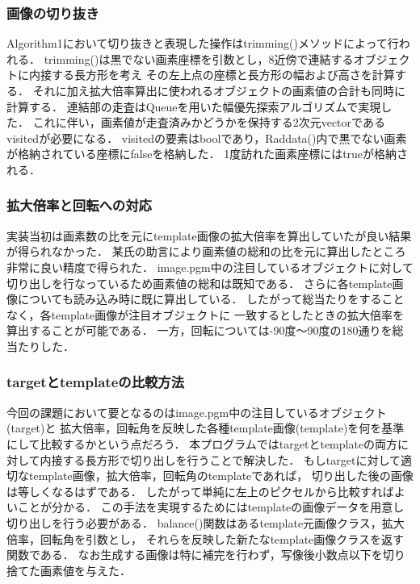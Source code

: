 \documentclass[uplatex,dvipdfmx]{jsarticle}
\begin{document}


\subsubsection{画像の切り抜き}
Algorithm1において切り抜きと表現した操作はtrimming()メソッドによって行われる．
trimming()は黒でない画素座標を引数とし，8近傍で連結するオブジェクトに内接する長方形を考え
その左上点の座標と長方形の幅および高さを計算する．
それに加え拡大倍率算出に使われるオブジェクトの画素値の合計も同時に計算する．
連結部の走査はQueueを用いた幅優先探索アルゴリズムで実現した．
これに伴い，画素値が走査済みかどうかを保持する2次元vectorであるvisitedが必要になる．
visitedの要素はboolであり，Raddata()内で黒でない画素が格納されている座標にfalseを格納した．
1度訪れた画素座標にはtrueが格納される．\\



\subsubsection{拡大倍率と回転への対応}
実装当初は画素数の比を元にtemplate画像の拡大倍率を算出していたが良い結果が得られなかった．
某氏の助言により画素値の総和の比を元に算出したところ非常に良い精度で得られた．
image.pgm中の注目しているオブジェクトに対して切り出しを行なっているため画素値の総和は既知である．
さらに各template画像についても読み込み時に既に算出している．
したがって総当たりをすることなく，各template画像が注目オブジェクトに
一致するとしたときの拡大倍率を算出することが可能である．
一方，回転については-90度〜90度の180通りを総当たりした．

\subsubsection{targetとtemplateの比較方法}
今回の課題において要となるのはimage.pgm中の注目しているオブジェクト(target)と
拡大倍率，回転角を反映した各種template画像(template)を何を基準にして比較するかという点だろう．
本プログラムではtargetとtemplateの両方に対して内接する長方形で切り出しを行うことで解決した．
もしtargetに対して適切なtemplate画像，拡大倍率，回転角のtemplateであれば，
切り出した後の画像は等しくなるはずである．
したがって単純に左上のピクセルから比較すればよいことが分かる．
この手法を実現するためにはtemplateの画像データを用意し切り出しを行う必要がある．
balance()関数はあるtemplate元画像クラス，拡大倍率，回転角を引数とし，
それらを反映した新たなtemplate画像クラスを返す関数である．
なお生成する画像は特に補完を行わず，写像後小数点以下を切り捨てた画素値を与えた．\\
\end{document}
